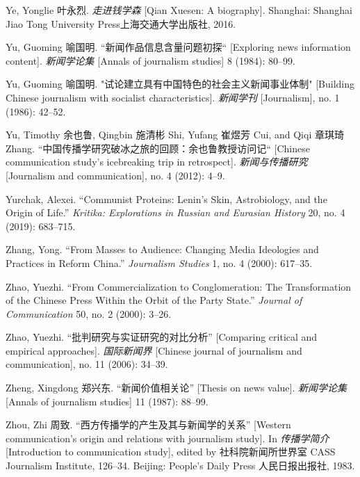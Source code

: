 \documentclass{tufte-handout}
\begin{document}
\begin{CJK*}{UTF8}{gbsn}
\begin{hangparas}{.25in}{1}
\begin{CJK*}{UTF8}{gbsn}
Ye, Yonglie 叶永烈. \emph{走进钱学森} {[}Qian Xuesen: A biography{]}.
Shanghai: Shanghai Jiao Tong University Press上海交通大学出版社, 2016.

Yu, Guoming 喻国明. ``新闻作品信息含量问题初探`` {[}Exploring news
information content{]}. \emph{新闻学论集} {[}Annals of journalism
studies{]} 8 (1984): 80--99.

Yu, Guoming 喻国明. "试论建立具有中国特色的社会主义新闻事业体制"
{[}Building Chinese journalism with socialist characteristics{]}.
\emph{新闻学刊} {[}Journalism{]}, no. 1 (1986): 42--52.

Yu, Timothy 余也鲁, Qingbin 施清彬 Shi, Yufang 崔煜芳 Cui, and Qiqi
章琪琦 Zhang. ``中国传播学研究破冰之旅的回顾：余也鲁教授访问记``
{[}Chinese communication study's icebreaking trip in retrospect{]}.
\emph{新闻与传播研究} {[}Journalism and communication{]}, no. 4 (2012):
4--9.

Yurchak, Alexei. ``Communist Proteins: Lenin's Skin, Astrobiology, and
the Origin of Life.'' \emph{Kritika: Explorations in Russian and
Eurasian History} 20, no. 4 (2019): 683--715.

Zhang, Yong. ``From Masses to Audience: Changing Media Ideologies and
Practices in Reform China.'' \emph{Journalism Studies} 1, no. 4 (2000):
617--35.

Zhao, Yuezhi. ``From Commercialization to Conglomeration: The
Transformation of the Chinese Press Within the Orbit of the Party
State.'' \emph{Journal of Communication} 50, no. 2 (2000): 3--26.

Zhao, Yuezhi. ``批判研究与实证研究的对比分析'' {[}Comparing critical and
empirical approaches{]}. \emph{国际新闻界} {[}Chinese journal of
journalism and communication{]}, no. 11 (2006): 34--39.

Zheng, Xingdong 郑兴东. ``新闻价值相关论'' {[}Thesis on news value{]}.
\emph{新闻学论集} {[}Annals of journalism studies{]} 11 (1987): 88--99.

\enlargethispage{\baselineskip}

Zhou, Zhi 周致. ``西方传播学的产生及其与新闻学的关系'' {[}Western
communication's origin and relations with journalism study{]}. In
\emph{传播学简介} {[}Introduction to communication study{]}, edited by
社科院新闻所世界室 CASS Journalism Institute, 126--34. Beijing: People's
Daily Press 人民日报出报社, 1983.

\end{CJK*}

\end{hangparas}
\vspace{2em}


\end{CJK*}
\end{document}

